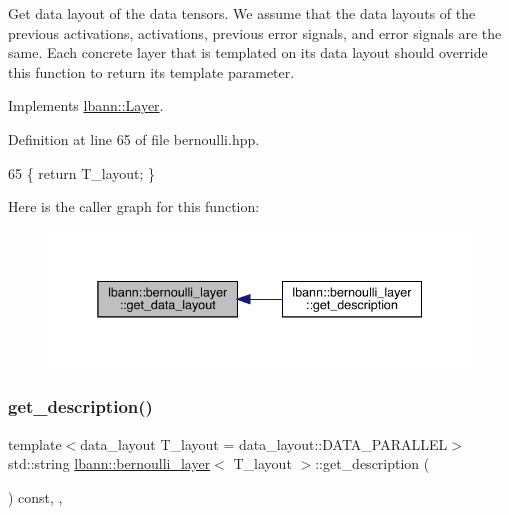 Get data layout of the data tensors. We assume that the data layouts of the previous activations, activations, previous error signals, and error signals are the same. Each concrete layer that is templated on its data layout should override this function to return its template parameter. 

Implements \hyperlink{classlbann_1_1Layer_a5dfb66e81fc085997402a5e2241316bd}{lbann\+::\+Layer}.



Definition at line 65 of file bernoulli.\+hpp.


\begin{DoxyCode}
65 \{ \textcolor{keywordflow}{return} T\_layout; \}
\end{DoxyCode}
Here is the caller graph for this function\+:\nopagebreak
\begin{figure}[H]
\begin{center}
\leavevmode
\includegraphics[width=338pt]{classlbann_1_1bernoulli__layer_aad1be2449edaa224b44bb6cef47599e9_icgraph}
\end{center}
\end{figure}
\mbox{\label{classlbann_1_1bernoulli__layer_a9d46943959793d5ba5e5eebe26063dad}} 
\subsubsection{\texorpdfstring{get\+\_\+description()}{get\_description()}}
{\footnotesize\ttfamily template$<$data\+\_\+layout T\+\_\+layout = data\+\_\+layout\+::\+D\+A\+T\+A\+\_\+\+P\+A\+R\+A\+L\+L\+EL$>$ \\
std\+::string \hyperlink{classlbann_1_1bernoulli__layer}{lbann\+::bernoulli\+\_\+layer}$<$ T\+\_\+layout $>$\+::get\+\_\+description (\begin{DoxyParamCaption}{ }\end{DoxyParamCaption}) const\hspace{0.3cm}{\ttfamily [inline]}, {\ttfamily [override]}, {\ttfamily [virtual]}}

